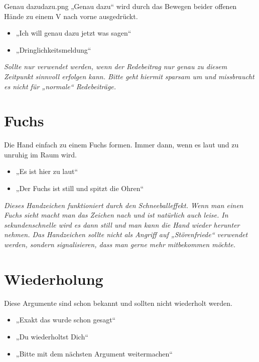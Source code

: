 \begin{handzeichen}{Genau dazu}{dazu.png} %
„Genau dazu“ wird durch das Bewegen beider offenen Hände zu einem V nach vorne
ausgedrückt.
\begin{itemize}
	\item „Ich will genau dazu jetzt was sagen“
	\item „Dringlichkeitsmeldung“
\end{itemize}
\end{handzeichen}
\emph{Sollte nur verwendet werden, wenn der Redebeitrag nur genau zu diesem
Zeitpunkt sinnvoll erfolgen kann. Bitte geht hiermit sparsam um und missbraucht
es nicht für „normale“ Redebeiträge.}

\section{Fuchs} %
Die Hand einfach zu einem Fuchs formen. Immer dann, wenn es laut und zu unruhig
im Raum wird.
\begin{itemize}
	\item „Es ist hier zu laut“
	\item „Der Fuchs ist still und spitzt die Ohren“
\end{itemize}
\emph{Dieses Handzeichen funktioniert durch den Schneeballeffekt. Wenn man
einen Fuchs sieht macht man das Zeichen nach und ist natürlich auch leise. In
sekundenschnelle wird es dann still und man kann die Hand wieder herunter
nehmen. Das Handzeichen sollte nicht als Angriff auf „Störenfriede“ verwendet
werden, sondern signalisieren, dass man gerne mehr mitbekommen möchte.}

\section{Wiederholung}
Diese Argumente sind schon bekannt und sollten nicht wiederholt werden.
\begin{itemize}
	\item „Exakt das wurde schon gesagt“
	\item „Du wiederholtst Dich“
	\item „Bitte mit dem nächsten Argument weitermachen“
\end{itemize}
